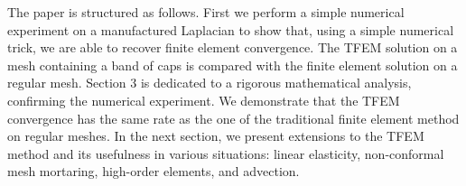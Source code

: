 \documentclass{article}
\theoremstyle{remark}
\begin{document}
The paper is structured as follows.
First we perform a simple numerical experiment on a manufactured Laplacian to show that, using a simple numerical trick, we are able to recover finite element convergence. The TFEM solution on a mesh containing a band of caps is compared with the finite element solution on a regular mesh. Section 3 is dedicated to a rigorous mathematical analysis, confirming the numerical experiment. We demonstrate that the TFEM convergence has the same rate as the one of the traditional finite element method on regular meshes. In the next section, we present extensions to the TFEM method and its usefulness in various situations: linear elasticity, non-conformal mesh mortaring, high-order elements, and advection. 
\end{document}
